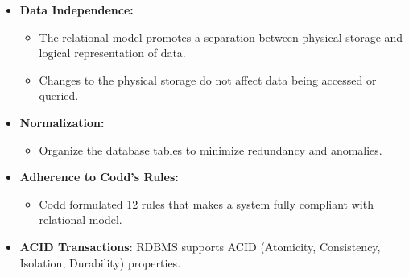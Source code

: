 \begin{flushleft}
\begin{itemize}
		\item \textbf{Data Independence:}
		\begin{itemize}
			\item The relational model promotes a separation between physical storage and logical representation of data. 
			\item Changes to the physical storage do not affect data being accessed or queried.
		\end{itemize}
	
		\item \textbf{Normalization:}
		\begin{itemize}
			\item Organize the database tables to minimize redundancy and anomalies.
		\end{itemize}
	
		\item \textbf{Adherence to Codd's Rules:}
		\begin{itemize}
			\item Codd formulated 12 rules  that makes a system fully compliant with relational model.
		\end{itemize}
	
		\item \textbf{ACID Transactions}: RDBMS supports ACID (Atomicity, Consistency, Isolation, Durability) properties.
	\end{itemize}
	
\end{flushleft}
